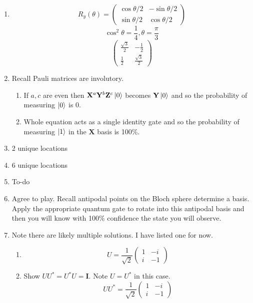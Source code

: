 \documentclass[12pt]{article}
\begin{document}
\begin{enumerate}[font=\bfseries]
    \item \[R_y(\theta) = \begin{pmatrix} \cos{\theta/2} & -\sin{\theta/2} \\
        \sin{\theta/2} & \cos{\theta/2}
        \end{pmatrix}\]
        \[\cos^2{\theta} = \frac{1}{4}, \theta = \frac{\pi}{3}\]
        \[\begin{pmatrix} 
        \frac{\sqrt{3}}{2} & -\frac{1}{2} \\
        \frac{1}{2} & \frac{\sqrt{3}}{2}
            \end{pmatrix}
        \]
    \item Recall Pauli matrices are involutory.
        \begin{enumerate}
            \item If $a,c$ are even then $\mathbf{X}^a\mathbf{Y}^b\mathbf{Z}^c\ket{0}$ becomes $\mathbf{Y}\ket{0}$ and so the probability of measuring $\ket{0}$ is 0. 
            \item Whole equation acts as a single identity gate and so the probability of measuring $\ket{1}$ in the $\mathbf{X}$ basis is 100\%.
        \end{enumerate}
    \item 2 unique locations
    \item 6 unique locations
    \item To-do
    \item Agree to play. Recall antipodal points on the Bloch sphere determine a basis. Apply the appropriate quantum gate to rotate into this antipodal basis and then you will know with 100\% confidence the state you will observe.
    \item Note there are likely multiple solutions. I have listed one for now.
        \begin{enumerate}
            \item \[U = \frac{1}{\sqrt{2}}\begin{pmatrix}
                        1 & -i \\
                        i & -1
                        \end{pmatrix}\]
            \item Show $UU^* = U^*U = \mathbf{I}$. Note $U = U^*$ in this case.
                \[UU^* = \frac{1}{\sqrt{2}}\begin{pmatrix}
                        1 & -i \\
                        i & -1
                        \end{pmatrix}
\]
\end{enumerate}
\end{enumerate}
\end{document}
